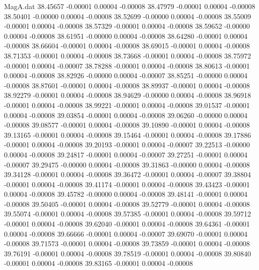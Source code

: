 \begin{filecontents}{MagA.dat}
  38.45657   -0.00001    0.00004   -0.00008
  38.47979   -0.00001    0.00004   -0.00008
  38.50401   -0.00000    0.00004   -0.00008
  38.52699   -0.00000    0.00004   -0.00008
  38.55009   -0.00001    0.00004   -0.00008
  38.57329   -0.00001    0.00004   -0.00008
  38.59652   -0.00000    0.00004   -0.00008
  38.61951   -0.00000    0.00004   -0.00008
  38.64280   -0.00001    0.00004   -0.00008
  38.66604   -0.00001    0.00004   -0.00008
  38.69015   -0.00001    0.00004   -0.00008
  38.71353   -0.00001    0.00004   -0.00008
  38.73668   -0.00001    0.00004   -0.00008
  38.75972   -0.00001    0.00004   -0.00007
  38.78288   -0.00001    0.00004   -0.00008
  38.80613   -0.00001    0.00004   -0.00008
  38.82926   -0.00000    0.00004   -0.00007
  38.85251   -0.00000    0.00004   -0.00008
  38.87601   -0.00001    0.00004   -0.00008
  38.89937   -0.00001    0.00004   -0.00008
  38.92279   -0.00001    0.00004   -0.00008
  38.94629   -0.00000    0.00004   -0.00008
  38.96918   -0.00001    0.00004   -0.00008
  38.99221   -0.00001    0.00004   -0.00008
  39.01537   -0.00001    0.00004   -0.00008
  39.03854   -0.00001    0.00004   -0.00008
  39.06260   -0.00000    0.00004   -0.00008
  39.08577   -0.00001    0.00004   -0.00008
  39.10890   -0.00001    0.00004   -0.00008
  39.13165   -0.00001    0.00004   -0.00008
  39.15464   -0.00001    0.00004   -0.00008
  39.17886   -0.00001    0.00004   -0.00008
  39.20193   -0.00001    0.00004   -0.00007
  39.22513   -0.00000    0.00004   -0.00008
  39.24817   -0.00001    0.00004   -0.00007
  39.27251   -0.00001    0.00004   -0.00007
  39.29475   -0.00000    0.00004   -0.00008
  39.31863   -0.00000    0.00004   -0.00008
  39.34128   -0.00001    0.00004   -0.00008
  39.36472   -0.00001    0.00004   -0.00007
  39.38804   -0.00001    0.00004   -0.00008
  39.41174   -0.00001    0.00004   -0.00008
  39.43423   -0.00001    0.00004   -0.00008
  39.45782   -0.00000    0.00004   -0.00008
  39.48141   -0.00001    0.00004   -0.00008
  39.50405   -0.00001    0.00004   -0.00008
  39.52779   -0.00001    0.00004   -0.00008
  39.55074   -0.00001    0.00004   -0.00008
  39.57385   -0.00001    0.00004   -0.00008
  39.59712   -0.00001    0.00004   -0.00008
  39.62040   -0.00001    0.00004   -0.00008
  39.64361   -0.00001    0.00004   -0.00008
  39.66666   -0.00001    0.00004   -0.00007
  39.69070   -0.00001    0.00004   -0.00008
  39.71573   -0.00001    0.00004   -0.00008
  39.73859   -0.00001    0.00004   -0.00008
  39.76191   -0.00001    0.00004   -0.00008
  39.78519   -0.00001    0.00004   -0.00008
  39.80840   -0.00001    0.00004   -0.00008
  39.83165   -0.00001    0.00004   -0.00008

\end{filecontents}
